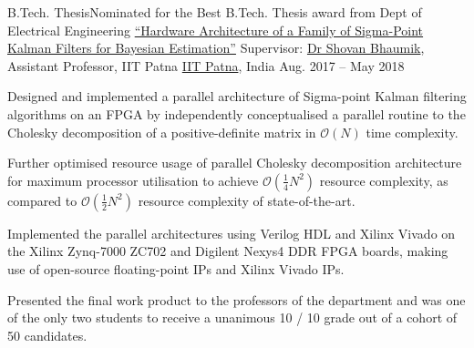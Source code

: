 \begin{cvexperience}
\cvposition
	{B.Tech. Thesis\quad\textbar\quad Nominated for the Best B.Tech. Thesis award from Dept of Electrical Engineering} %
	{\href{https://github.com/haitmak/sigma}{``Hardware Architecture of a Family of Sigma-Point Kalman Filters for Bayesian Estimation''}} %
	{Supervisor: \href{http://www.tutorialpoint.org/ShovanBhaumik/index.html}{Dr Shovan Bhaumik}, Assistant Professor, IIT Patna} %
	{\href{https://www.iitp.ac.in}{IIT Patna}, India} %
	{Aug. 2017 -- May 2018} %
	{\begin{cvitems} %
		\item {Designed and implemented a parallel architecture of Sigma-point Kalman filtering algorithms on an FPGA by independently conceptualised a parallel routine to the Cholesky decomposition of a positive-definite matrix in $\mathcal{O} \left( N \right)$ time complexity.}
		\item {Further optimised resource usage of parallel Cholesky decomposition architecture for maximum processor utilisation to achieve $\mathcal{O} \left( \frac{1}{4} N^2 \right)$ resource complexity, as compared to $\mathcal{O} \left( \frac{1}{2} N^2 \right)$ resource complexity of state-of-the-art.}
		\item {Implemented the parallel architectures using Verilog HDL and Xilinx Vivado on the Xilinx Zynq-7000 ZC702 and Digilent Nexys4 DDR FPGA boards, making use of open-source floating-point IPs and Xilinx Vivado IPs.}
		\item {Presented the final work product to the professors of the department and was one of the only two students to receive a unanimous 10 / 10 grade out of a cohort of 50 candidates.}
	\end{cvitems}}


\end{cvexperience}
